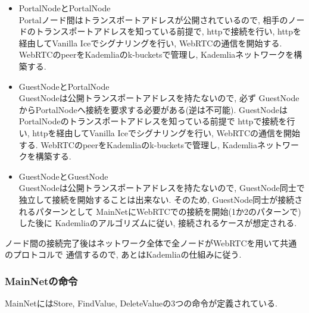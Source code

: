 \documentclass[sotsuron]{jcsie}
\begin{document}
\begin{itemize}
	\item {PortalNodeとPortalNode}\\
	      Portalノード間はトランスポートアドレスが公開されているので, 
	      相手のノードのトランスポートアドレスを知っている前提で, 
	      httpで接続を行い, httpを経由してVanilla Iceでシグナリングを行い, 
	      WebRTCの通信を開始する.
	      WebRTCのpeerをKademliaのk-bucketsで管理し, 
	      Kademliaネットワークを構築する.
	      \\
	\item {GuestNodeとPortalNode}\\
	      GuestNodeは公開トランスポートアドレスを持たないので, 必ず
	      GuestNodeからPortalNodeへ接続を要求する必要がある(逆は不可能).
	      GuestNodeはPortalNodeのトランスポートアドレスを知っている前提で
	      httpで接続を行い, httpを経由してVanilla Iceでシグナリングを行い, 
	      WebRTCの通信を開始する.
	      WebRTCのpeerをKademliaのk-bucketsで管理し, 
	      Kademliaネットワークを構築する.
	      \\
	\item {GuestNodeとGuestNode}\\
	      GuestNodeは公開トランスポートアドレスを持たないので, 
	      GuestNode同士で独立して接続を開始することは出来ない.
	      そのため, GuestNode同士が接続されるパターンとして
	      MainNetにWebRTCでの接続を開始(1か2のパターンで)した後に
	      Kademliaのアルゴリズムに従い, 接続されるケースが想定される.
\end{itemize}

ノード間の接続完了後はネットワーク全体で全ノードがWebRTCを用いて共通のプロトコルで
通信するので, あとはKademliaの仕組みに従う.

\subsubsection{MainNetの命令}
MainNetにはStore, FindValue, DeleteValueの3つの命令が定義されている.
\end{document}
